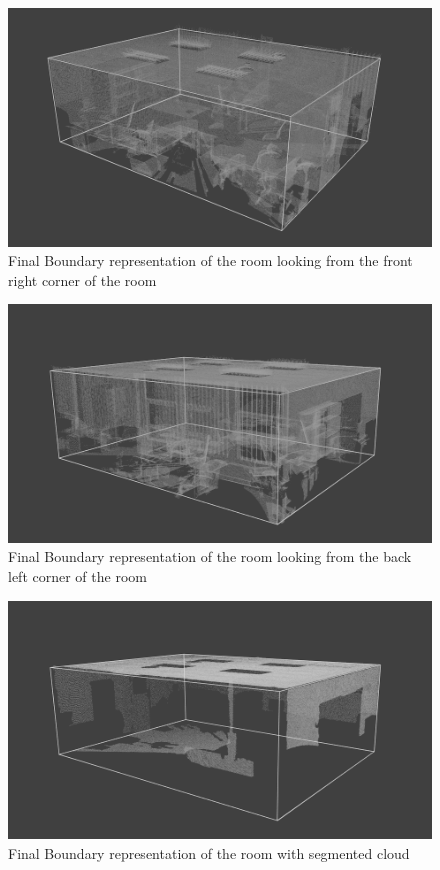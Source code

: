 			\begin{figure}[H]
			\centering
			\includegraphics[width=1\linewidth]{Includes/images/f/full4}
			\caption{Final Boundary representation of the room looking from the front right corner of the room}
			\label{fig:full2}
			\end{figure}

			\begin{figure}[H]
			\centering
			\includegraphics[width=1\linewidth]{Includes/images/f/full2}
			\caption{Final Boundary representation of the room looking from the back left corner of the room}
			\label{fig:full3}
			\end{figure}
			
			
			\begin{figure}[H]
			\centering
			\includegraphics[width=1\linewidth]{Includes/images/f/untitled}
			\caption{Final Boundary representation of the room with segmented cloud}
			\label{fig:untitled}
			\end{figure}
			

			
			